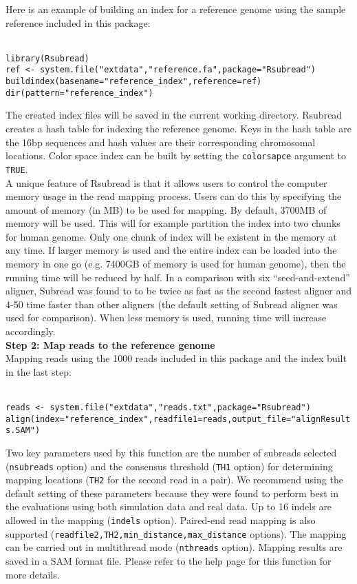 \documentclass[12pt]{article}
\newcommand{\R}[1]{{\texttt{#1}}}
\begin{document}
Here is an example of building an index for a reference genome using the sample reference included in this package:

\R{\\
library(Rsubread)\\
ref <- system.file("extdata","reference.fa",package="Rsubread")\\
buildindex(basename="reference\_index",reference=ref)\\
dir(pattern="reference\_index")\\
}

The created index files will be saved in the current working directory.
Rsubread creates a hash table for indexing the reference genome. 
Keys in the hash table are the 16bp sequences and hash values are their corresponding chromosomal locations. 
Color space index can be built by setting the \R{colorsapce} argument to \R{TRUE}.\\

A unique feature of Rsubread is that it allows users to control the computer memory usage in the read mapping process.
Users can do this by specifying the amount of memory (in MB) to be used for mapping.
By default, 3700MB of memory will be used.
This will for example partition the index into two chunks for human genome.
Only one chunk of index will be existent in the memory at any time.
If larger memory is used and the entire index can be loaded into the memory in one go (e.g. 7400GB of memory is used for human genome), then the running time will be reduced by half.
In a comparison with six ``seed-and-extend'' aligner, Subread was found to to be twice as fast as the second fastest aligner and 4-50 time faster than other aligners (the default setting of Subread aligner was used for comparison).
When less memory is used, running time will increase accordingly.\\

{\noindent\bf Step 2: Map reads to the reference genome\\}
Mapping reads using the 1000 reads included in this package and the index built in the last step:

\R{\\
reads <- system.file("extdata","reads.txt",package="Rsubread")\\
align(index="reference\_index",readfile1=reads,output\_file="alignResults.SAM")
}

Two key parameters used by this function are the number of subreads selected (\R{nsubreads} option) and the consensus threshold (\R{TH1} option) for determining mapping locations (\R{TH2} for the second read in a pair). 
We recommend using the default setting of these parameters because they were found to perform best in the evaluations using both simulation data and real data.
Up to 16 indels are allowed in the mapping (\R{indels} option).
Paired-end read mapping is also supported (\R{readfile2,TH2,min\_distance,max\_distance} options).
The mapping can be carried out in multithread mode (\R{nthreads} option).
Mapping results are saved in a SAM format file.
Please refer to the help page for this function for more details.\\
\end{document}
